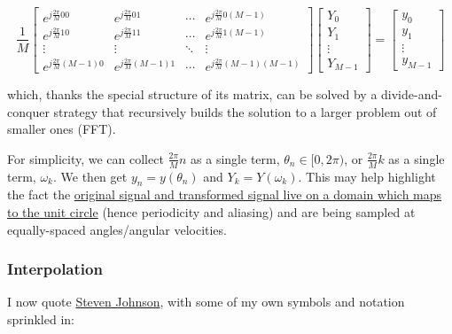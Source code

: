 \documentclass[10pt]{article}
\begin{document}
$$\frac{1}{M}\begin{bmatrix}
  e^{j \frac{2\pi}{M} 0 0} & e^{j \frac{2\pi}{M} 0 1} & \cdots & e^{j \frac{2\pi}{M} 0 (M-1)}\\
  e^{j \frac{2\pi}{M} 1 0} & e^{j \frac{2\pi}{M} 1 1} & \cdots & e^{j \frac{2\pi}{M} 1 (M-1)} \\
  \vdots & \vdots & \ddots & \vdots\\
  e^{j \frac{2\pi}{M} (M-1) 0} & e^{j \frac{2\pi}{M} (M-1) 1} & \cdots & e^{j \frac{2\pi}{M} (M-1) (M-1)}
\end{bmatrix}
\begin{bmatrix} Y_0 \\ Y_1 \\ \vdots \\ Y_{M-1} \end{bmatrix}
= \begin{bmatrix} y_0 \\ y_1 \\ \vdots \\ y_{M-1} \end{bmatrix}$$

\noindent which, thanks the special structure of its matrix, can be solved by a divide-and-conquer strategy that recursively builds the solution to a larger problem out of smaller ones (FFT)\cite{kutz}.

For simplicity, we can collect $\frac{2\pi}{M}n$ as a single term, $\theta_n \in [0, 2\pi)$, or $\frac{2\pi}{M}k$ as a single term, $\omega_k$. We then get $y_n = y(\theta_n)$ and $Y_k = Y(\omega_k)$. This may help highlight the fact the \href{https://dsp.stackexchange.com/a/18931/40873}{original signal and transformed signal live on a domain which maps to the unit circle}\cite{bristow} (hence periodicity and aliasing) and are being sampled at equally-spaced angles/angular velocities.

\subsubsection{Interpolation}

I now quote \href{https://math.mit.edu/~stevenj/fft-deriv.pdf}{Steven Johnson}\cite{johnson}, with some of my own symbols and notation sprinkled in:
\end{document}
